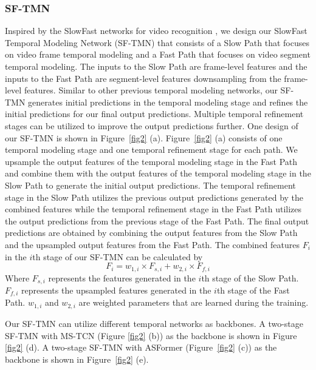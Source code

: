 \documentclass[sn-mathphys,Numbered]{sn-jnl}
\theoremstyle{thmstyleone}\newtheorem{theorem}{Theorem}\newtheorem{proposition}[theorem]{Proposition}
\theoremstyle{thmstyletwo}\newtheorem{example}{Example}\newtheorem{remark}{Remark}
\theoremstyle{thmstylethree}\newtheorem{definition}{Definition}
\begin{document}
\subsubsection{SF-TMN}
Inspired by the SlowFast networks for video recognition \cite{feichtenhofer2019slowfast}, we design our SlowFast Temporal Modeling Network (SF-TMN) that consists of a Slow Path that focuses on video frame temporal modeling and a Fast Path that focuses on video segment temporal modeling. The inputs to the Slow Path are frame-level features and the inputs to the Fast Path are segment-level features downsampling from the frame-level features. Similar to other previous temporal modeling networks, our SF-TMN generates initial predictions in the temporal modeling stage and refines the initial predictions for our final output predictions. Multiple temporal refinement stages can be utilized to improve the output predictions further. One design of our SF-TMN is shown in Figure~\ref{fig2} (a). Figure~\ref{fig2} (a) consists of one temporal modeling stage and one temporal refinement stage for each path. We upsample the output features of the temporal modeling stage in the Fast Path and combine them with the output features of the temporal modeling stage in the Slow Path to generate the initial output predictions. The temporal refinement stage in the Slow Path utilizes the previous output predictions generated by the combined features while the temporal refinement stage in the Fast Path utilizes the output predictions from the previous stage of the Fast Path. The final output predictions are obtained by combining the output features from the Slow Path and the upsampled output features from the Fast Path. The combined features $F_{i}$ in the $i$th stage of our SF-TMN can be calculated by
\begin{equation}
F_{i} = w_{1,i} \times F_{s, i}  + w_{2,i} \times F_{f, i} 
\end{equation}
Where $F_{s, i}$ represents the features generated in the $i$th stage of the Slow Path. $F_{f, i}$ represents the upsampled features generated in the $i$th stage of the Fast Path. $w_{1,i}$ and $w_{2,i}$ are weighted parameters that are learned during the training.

Our SF-TMN can utilize different temporal networks as backbones. A two-stage SF-TMN with MS-TCN (Figure \ref{fig2} (b)) as the backbone is shown in Figure \ref{fig2} (d). A two-stage SF-TMN with ASFormer (Figure~\ref{fig2} (c)) as the backbone is shown in Figure~\ref{fig2} (e).
\end{document}
